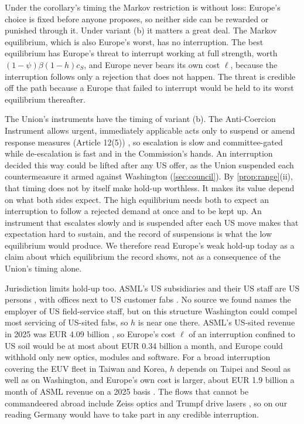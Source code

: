 Under the corollary's timing the Markov restriction is without loss: Europe's choice is fixed before anyone proposes, so neither side can be rewarded or punished through it. Under variant (b) it matters a great deal. The Markov equilibrium, which is also Europe's worst, has no interruption. The best equilibrium has Europe's threat to interrupt working at full strength, worth $(1-\psi)\beta(1-h)c_S$, and Europe never bears its own cost $\ell$, because the interruption follows only a rejection that does not happen. The threat is credible off the path because a Europe that failed to interrupt would be held to its worst equilibrium thereafter.

The Union's instruments have the timing of variant (b). The Anti-Coercion Instrument allows urgent, immediately applicable acts only to suspend or amend response measures (Article 12(5)) \citep{eu2023aci}, so escalation is slow and committee-gated while de-escalation is fast and in the Commission's hands. An interruption decided this way could be lifted after any US offer, as the Union suspended each countermeasure it armed against Washington (\cref{sec:council}). By \cref{prop:range}(ii), that timing does not by itself make hold-up worthless. It makes its value depend on what both sides expect. The high equilibrium needs both to expect an interruption to follow a rejected demand at once and to be kept up. An instrument that escalates slowly and is suspended after each US move makes that expectation hard to sustain, and the record of suspensions is what the low equilibrium would produce. We therefore read Europe's weak hold-up today as a claim about which equilibrium the record shows, not as a consequence of the Union's timing alone.

Jurisdiction limits hold-up too. ASML's US subsidiaries and their US staff are US persons \citep{ecfr2026usperson, asml2026subsidiaries}, with offices next to US customer fabs \citep{asml2026locations}. No source we found names the employer of US field-service staff, but on this structure Washington could compel most servicing of US-sited fabs, so $h$ is near one there. ASML's US-sited revenue in 2025 was EUR 4.09 billion \citep{asml2026annual}, so Europe's cost $\ell$ of an interruption confined to US soil would be at most about EUR 0.34 billion a month, and Europe could withhold only new optics, modules and software. For a broad interruption covering the EUV fleet in Taiwan and Korea, $h$ depends on Taipei and Seoul as well as on Washington, and Europe's own cost is larger, about EUR 1.9 billion a month of ASML revenue on a 2025 basis \citep{asml2026annual}. The flows that cannot be commandeered abroad include Zeiss optics and Trumpf drive lasers \citep{asml2026annual, varas2021strengthening}, so on our reading Germany would have to take part in any credible interruption.

